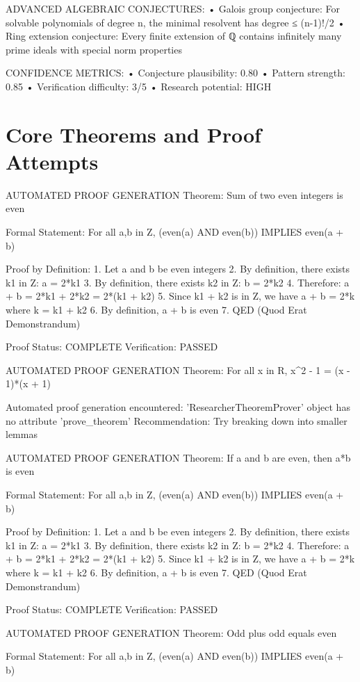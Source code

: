 \documentclass{article}
\begin{document}
ADVANCED ALGEBRAIC CONJECTURES:
• Galois group conjecture: For solvable polynomials of degree n,
  the minimal resolvent has degree ≤ (n-1)!/2
• Ring extension conjecture: Every finite extension of ℚ
  contains infinitely many prime ideals with special norm properties

CONFIDENCE METRICS:
• Conjecture plausibility: 0.80
• Pattern strength: 0.85
• Verification difficulty: 3/5
• Research potential: HIGH



\section{Core Theorems and Proof Attempts}

AUTOMATED PROOF GENERATION
Theorem: Sum of two even integers is even

Formal Statement: For all a,b in Z, (even(a) AND even(b)) IMPLIES even(a + b)

Proof by Definition:
1. Let a and b be even integers
2. By definition, there exists k1 in Z: a = 2*k1
3. By definition, there exists k2 in Z: b = 2*k2
4. Therefore: a + b = 2*k1 + 2*k2 = 2*(k1 + k2)
5. Since k1 + k2 is in Z, we have a + b = 2*k where k = k1 + k2
6. By definition, a + b is even
7. QED (Quod Erat Demonstrandum)

Proof Status: COMPLETE
Verification: PASSED


AUTOMATED PROOF GENERATION
Theorem: For all x in R, x^2 - 1 = (x - 1)*(x + 1)

Automated proof generation encountered: 'ResearcherTheoremProver' object has no attribute 'prove_theorem'
Recommendation: Try breaking down into smaller lemmas


AUTOMATED PROOF GENERATION
Theorem: If a and b are even, then a*b is even

Formal Statement: For all a,b in Z, (even(a) AND even(b)) IMPLIES even(a + b)

Proof by Definition:
1. Let a and b be even integers
2. By definition, there exists k1 in Z: a = 2*k1
3. By definition, there exists k2 in Z: b = 2*k2
4. Therefore: a + b = 2*k1 + 2*k2 = 2*(k1 + k2)
5. Since k1 + k2 is in Z, we have a + b = 2*k where k = k1 + k2
6. By definition, a + b is even
7. QED (Quod Erat Demonstrandum)

Proof Status: COMPLETE
Verification: PASSED


AUTOMATED PROOF GENERATION
Theorem: Odd plus odd equals even

Formal Statement: For all a,b in Z, (even(a) AND even(b)) IMPLIES even(a + b)
\end{document}
